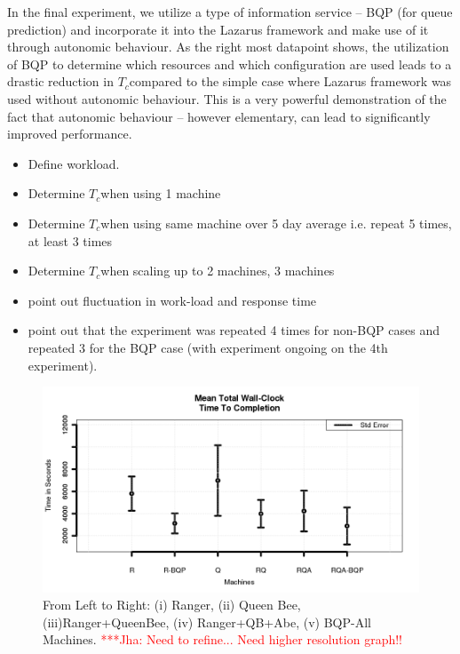 \documentclass[conference,final]{IEEEtran}
\newcommand{\tc}{$T_c$}
\newcommand{\jhanote}[1]{ {\textcolor{red} { ***Jha: #1 }}}
\newcommand{\jhanote}[1]{}
\begin{document}
In the final experiment, we utilize a type of information service --
BQP (for queue prediction) and incorporate it into the Lazarus
framework and make use of it through autonomic behaviour.  As the
right most datapoint shows, the utilization of BQP to determine which
resources and which configuration are used leads to a drastic
reduction in \tc compared to the simple case where Lazarus framework
was used without autonomic behaviour. This is a very powerful
demonstration of the fact that autonomic behaviour -- however
elementary, can lead to significantly improved performance.

\begin{itemize}
\item Define workload.
\item Determine  \tc when using 1 machine 
\item Determine \tc when using same machine over 5 day average i.e. repeat 5    times, at least 3 times
\item Determine \tc when scaling up to 2 machines, 3 machines 
\item point out fluctuation in work-load and response time
\item point out that the experiment was repeated 4 times for non-BQP
  cases and repeated 3 for the BQP case (with experiment ongoing on
  the 4th experiment).
\end{itemize}

\begin{figure}
\begin{center}
\includegraphics[scale=0.35]{./figures/Figure7.png}
\end{center}
\caption{From Left to Right: (i) Ranger, (ii) Queen Bee,
  (iii)Ranger+QueenBee, (iv) Ranger+QB+Abe, (v) BQP-All
  Machines. \jhanote{ Need to refine... Need higher resolution graph!!}}
\label{fig:application_architecture}
\end{figure}
\end{document}
